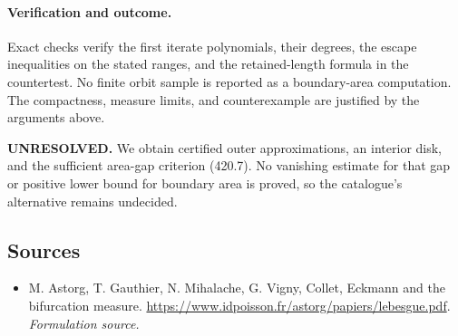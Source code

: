 \documentclass[11pt]{article}
\begin{document}
\paragraph{Verification and outcome.}
Exact checks verify the first iterate polynomials, their degrees, the escape inequalities on the stated ranges, and the retained-length formula in the countertest. No finite orbit sample is reported as a boundary-area computation. The compactness, measure limits, and counterexample are justified by the arguments above.

\textbf{UNRESOLVED.} We obtain certified outer approximations, an interior disk, and the sufficient area-gap criterion (420.7). No vanishing estimate for that gap or positive lower bound for boundary area is proved, so the catalogue's alternative remains undecided.

\subsection{Sources}
\begin{itemize}
\item[S1]M. Astorg, T. Gauthier, N. Mihalache, G. Vigny, Collet, Eckmann and the bifurcation measure.
\url{https://www.idpoisson.fr/astorg/papiers/lebesgue.pdf}.
\textit{Formulation source.}
\end{itemize}
\end{document}
